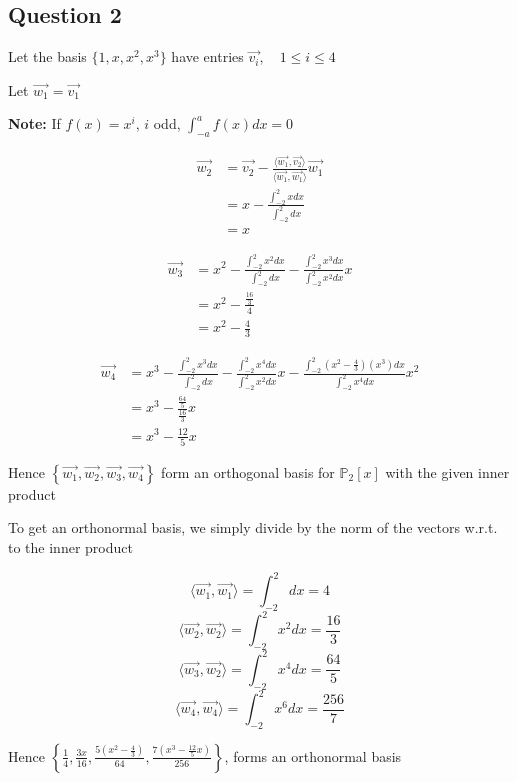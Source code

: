 \documentclass{article}
\begin{document}
\subsection*{Question 2}
Let the basis \(\{1,x,x^2,x^3\}\) have entries \(\vec{v_i}, \quad 1 \leq i \leq 4\)

Let \(\vec{w_1} = \vec{v_1}\)

\textbf{Note:}
If \(f(x) = x^i\), \(i\) odd, \(\int_{-a}^{a} f(x) dx = 0\)

\begin{align*}
    \vec{w_2} &= \vec{v_2}  - \frac{\langle \vec{w_1}, \vec{v_2} \rangle}{\langle \vec{w_1}, \vec{w_1} \rangle} \vec{w_1} \\
    &= x - \frac{\int_{-2}^{2} x dx}{\int_{-2}^{2} dx} \\
    &= x
\end{align*}

\begin{align*}
    \vec{w_3} &= x^2 - \frac{\int_{-2}^{2}x^2 dx}{\int_{-2}^{2}dx} - \frac{\int_{-2}^{2}x^3 dx}{\int_{-2}^{2} x^2 dx}x \\
    &= x^2 - \frac{\frac{16}{3}}{4} \\
    &= x^2 - \frac{4}{3}
\end{align*}

\begin{align*}
    \vec{w_4} &= x^3 - \frac{\int_{-2}^{2}x^3dx}{\int_{-2}^{2} dx} - \frac{\int_{-2}^{2}x^4 dx}{\int_{-2}^{2}x^2 dx}x - \frac{\int_{-2}^{2}(x^2 - \frac{4}{3})(x^3) dx}{\int_{-2}^{2}x^4 dx}x^2 \\
    &= x^3 - \frac{\frac{64}{5}}{\frac{16}{3}}x \\
    &= x^3 - \frac{12}{5}x
\end{align*}

Hence \(\left\{ \vec{w_1}, \vec{w_2}, \vec{w_3}, \vec{w_4} \right\}\) form an orthogonal basis for \(\mathbb{P}_2[x]\) with the given inner product

To get an orthonormal basis, we simply divide by the norm of the vectors w.r.t. to the inner product

\[
\langle \vec{w_1}, \vec{w_1} \rangle = \int_{-2}^{2} dx = 4
\]
\[
\langle \vec{w_2}, \vec{w_2} \rangle = \int_{-2}^{2} x^2 dx = \frac{16}{3}
\]
\[
\langle \vec{w_3}, \vec{w_2} \rangle = \int_{-2}^{2} x^4 dx = \frac{64}{5}
\]
\[
\langle \vec{w_4}, \vec{w_4} \rangle = \int_{-2}^{2} x^6 dx = \frac{256}{7}
\]

Hence \(\left\{ \frac{1}{4}, \frac{3x}{16}, \frac{5(x^2 - \frac{4}{3})}{64}, \frac{7(x^3 - \frac{12}{5}x)}{256}\right\}\), forms an orthonormal basis
\end{document}

